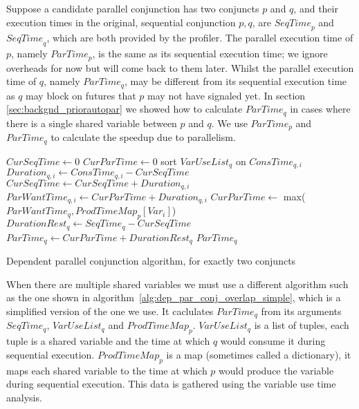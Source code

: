 Suppose a candidate parallel conjunction has two conjuncts $p$ and $q$,
and their execution times in the original, sequential conjunction $p, q$,
are ${SeqTime}_p$ and ${SeqTime}_q$, which are both provided by the profiler.
The parallel execution time of $p$, namely $ParTime_p$,
is the same as its sequential execution time;
we ignore overheads for now but will come back to them later.
Whilst the parallel execution time of $q$, namely $ParTime_q$, may be
different from its sequential execution time as $q$ may block on futures
that $p$ may not have signaled yet.
In section \ref{sec:backgnd_priorautopar} we showed how to calculate
$ParTime_q$ in cases where there is a single shared variable between $p$ and
$q$.
We use $ParTime_p$ and $ParTime_q$ to calculate the speedup due to
parallelism.

\begin{algorithm}
\begin{algorithmic}[5]
\State $CurSeqTime \gets 0$
\State $CurParTime \gets 0$
\State sort $VarUseList_q$ on $ConsTime_{q, i}$
    \State $Duration_{q, i} \gets ConsTime_{q, i} - CurSeqTime$
    \State $CurSeqTime \gets CurSeqTime + Duration_{q, i}$
    \State $ParWantTime_{q, i} \gets CurParTime + Duration_{q, i}$
    \State $CurParTime \gets$ max($ParWantTime_q, ProdTimeMap_{p}[Var_i]$)
\EndFor
\State $DurationRest_q \gets SeqTime_q - CurSeqTime$
\State $ParTime_q \gets CurParTime + DurationRest_q$
\State \Return $ParTime_q$
\EndProcedure
\end{algorithmic}
\caption{Dependent parallel conjunction algorithm, for exactly two conjuncts}
\label{alg:dep_par_conj_overlap_simple}
\end{algorithm}

When there are multiple shared variables we must use a different algorithm
such as the one shown in algorithm~\ref{alg:dep_par_conj_overlap_simple},
which is a simplified version of the one we use.
It caclulates $ParTime_q$ from its arguments $SeqTime_q$, $VarUseList_q$ and
$ProdTimeMap_p$.
$VarUseList_q$ is a list of tuples,
each tuple is a shared variable and the time at which $q$ would consume it
during sequential execution.
$ProdTimeMap_p$ is a map (sometimes called a dictionary),
it maps each shared variable to the time at which $p$ would produce the
variable during sequential execution.
This data is gathered using the variable use time analysis.

